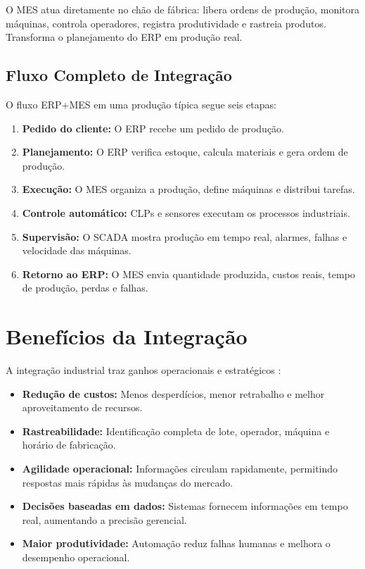 \documentclass[12pt,a4paper,oneside]{article}
\begin{document}
O MES atua diretamente no chão de fábrica: libera ordens de produção, monitora máquinas, controla operadores, registra produtividade e rastreia produtos. Transforma o planejamento do ERP em produção real.

\subsection{Fluxo Completo de Integração}

O fluxo ERP+MES em uma produção típica segue seis etapas:

\begin{enumerate}
  \item \textbf{Pedido do cliente:} O ERP recebe um pedido de produção.
  \item \textbf{Planejamento:} O ERP verifica estoque, calcula materiais e gera ordem de produção.
  \item \textbf{Execução:} O MES organiza a produção, define máquinas e distribui tarefas.
  \item \textbf{Controle automático:} CLPs e sensores executam os processos industriais.
  \item \textbf{Supervisão:} O SCADA mostra produção em tempo real, alarmes, falhas e velocidade das máquinas.
  \item \textbf{Retorno ao ERP:} O MES envia quantidade produzida, custos reais, tempo de produção, perdas e falhas.
\end{enumerate}

\section{Benefícios da Integração}

A integração industrial traz ganhos operacionais e estratégicos \cite{cardoso2021}:

\begin{itemize}
  \item \textbf{Redução de custos:} Menos desperdícios, menor retrabalho e melhor aproveitamento de recursos.
  \item \textbf{Rastreabilidade:} Identificação completa de lote, operador, máquina e horário de fabricação.
  \item \textbf{Agilidade operacional:} Informações circulam rapidamente, permitindo respostas mais rápidas às mudanças do mercado.
  \item \textbf{Decisões baseadas em dados:} Sistemas fornecem informações em tempo real, aumentando a precisão gerencial.
  \item \textbf{Maior produtividade:} Automação reduz falhas humanas e melhora o desempenho operacional.
\end{itemize}
\end{document}
